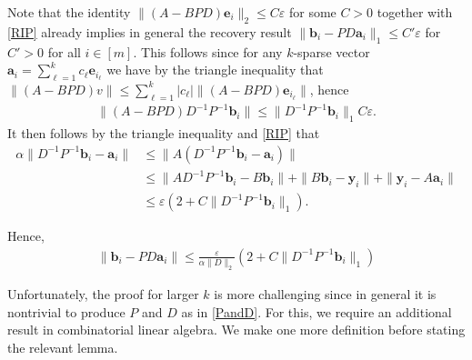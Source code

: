 \documentclass[journal, onecolumn]{IEEEtran}
\begin{document}

Note that the identity $\|(A - BPD)\mathbf{e}_i\|_2 \leq C\varepsilon$ for some $C > 0$ together with \eqref{RIP} already implies in general the recovery result $\|\mathbf{b}_i - PD\mathbf{a}_i\|_1 \leq C'\varepsilon$ for $C' > 0$ for all $i \in [m]$. This follows since for any $k$-sparse vector $\mathbf{a}_i = \sum_{\ell=1}^{k} c_\ell \mathbf{e}_{i_\ell}$ we have by the triangle inequality that $\|(A-BPD)v\| \leq \sum_{\ell=1}^{k}|c_\ell| \|(A-BPD)\mathbf{e}_{i_\ell}\|$, hence
\begin{align*}
\|(A - BPD)D^{-1}P^{-1}\mathbf{b}_i\| \leq \|D^{-1}P^{-1}\mathbf{b}_i\|_1C\varepsilon.
\end{align*}
%
It then follows by the triangle inequality and \eqref{RIP} that
\begin{align*}
\alpha \|D^{-1}P^{-1}\mathbf{b}_i - \mathbf{a}_i\| &\leq \|A(D^{-1}P^{-1}\mathbf{b}_i - \mathbf{a}_i)\| \\
&\leq \| AD^{-1}P^{-1}\mathbf{b}_i - B\mathbf{b}_i\| + \|B\mathbf{b}_i - \mathbf{y}_i\| + \|\mathbf{y}_i - A\mathbf{a}_i\| \\
&\leq  \varepsilon  \left( 2 + C\|D^{-1}P^{-1}\mathbf{b}_i\|_1 \right).
\end{align*}

Hence,
\begin{align}
\|\mathbf{b}_i - PD\mathbf{a}_i\| \leq  \frac{\varepsilon}{\alpha\|D\|_2}\left( 2 + C\|D^{-1}P^{-1}\mathbf{b}_i\|_1 \right)
\end{align}


Unfortunately, the proof for larger $k$ is more challenging since in general it is nontrivial to produce $P$ and $D$ as in \eqref{PandD}. For this, we require an additional result in combinatorial linear algebra. We make one more definition before stating the relevant lemma.  
\end{document}
